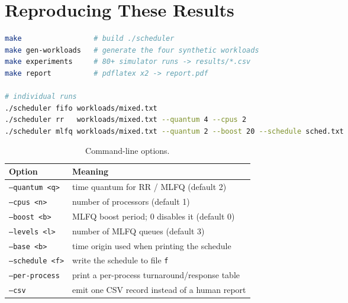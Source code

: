 \documentclass[11pt,a4paper]{article}
\begin{document}
\appendix
\section{Reproducing These Results}

\begin{lstlisting}[language=bash]
make                 # build ./scheduler
make gen-workloads   # generate the four synthetic workloads
make experiments     # 80+ simulator runs -> results/*.csv
make report          # pdflatex x2 -> report.pdf

# individual runs
./scheduler fifo workloads/mixed.txt
./scheduler rr   workloads/mixed.txt --quantum 4 --cpus 2
./scheduler mlfq workloads/mixed.txt --quantum 2 --boost 20 --schedule sched.txt
\end{lstlisting}

\begin{table}[h]
\centering
\begin{tabular}{ll}
\toprule
Option & Meaning \\
\midrule
\texttt{--quantum <q>}  & time quantum for RR / MLFQ (default 2) \\
\texttt{--cpus <n>}     & number of processors (default 1) \\
\texttt{--boost <b>}    & MLFQ boost period; 0 disables it (default 0) \\
\texttt{--levels <l>}   & number of MLFQ queues (default 3) \\
\texttt{--base <b>}     & time origin used when printing the schedule \\
\texttt{--schedule <f>} & write the schedule to file \texttt{f} \\
\texttt{--per-process}  & print a per-process turnaround/response table \\
\texttt{--csv}          & emit one CSV record instead of a human report \\
\bottomrule
\end{tabular}
\caption{Command-line options.}
\end{table}
\end{document}

